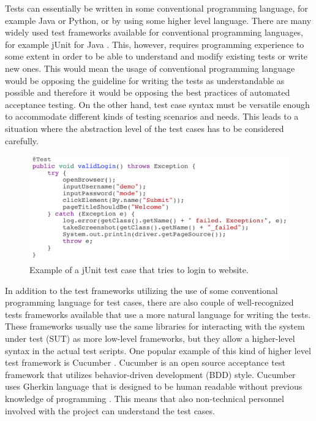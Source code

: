 Tests can essentially be written in some conventional programming language, for example Java or Python, or by using some higher level language. There are many widely used test frameworks available for conventional programming languages, for example jUnit for Java \citep{junit}. This, however, requires programming experience to some extent in order to be able to understand and modify existing tests or write new ones. This would mean the usage of conventional programming language would be opposing the guideline for writing the tests as understandable as possible and therefore it would be opposing the best practices of automated acceptance testing. On the other hand, test case syntax must be versatile enough to accommodate different kinds of testing scenarios and needs. This leads to a situation where the abstraction level of the test cases has to be considered carefully.

\begin{figure}[ht]
  \begin{center}
    \includegraphics[width=13cm]{images/junit_example.png}
    \caption{Example of a jUnit test case that tries to login to website.}
    \label{fig:junit}
  \end{center}
\end{figure}
\FloatBarrier

In addition to the test frameworks utilizing the use of some conventional programming language for test cases, there are also couple of well-recognized tests frameworks available that use a more natural language for writing the tests. These frameworks usually use the same libraries for interacting with the system under test (SUT) as more low-level frameworks, but they allow a higher-level syntax in the actual test scripts. One popular example of this kind of higher level test framework is Cucumber \citep{cucumber}. Cucumber is an open source acceptance test framework that utilizes behavior-driven development (BDD) style. Cucumber uses Gherkin language that is designed to be human readable without previous knowledge of programming \citep{gherkin}. This means that also non-technical personnel involved with the project can understand the test cases.

